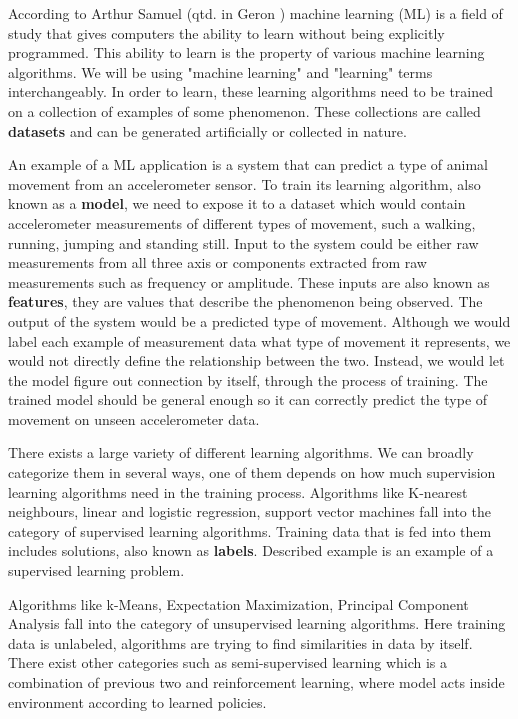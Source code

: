 According to Arthur Samuel (qtd. in Geron \cite{geron}) machine learning (ML) is a field of study that gives computers the ability to learn without being explicitly programmed.
This ability to learn is the property of various machine learning algorithms.
We will be using "machine learning" and "learning" terms interchangeably. 
In order to learn, these learning algorithms need to be trained on a collection of examples of some phenomenon\cite{burkovml}. 
These collections are called \textbf{datasets} and can be generated artificially or collected in nature.

An example of a ML application is a system that can predict a type of animal movement from an accelerometer sensor.
To train its learning algorithm, also known as a \textbf{model}, we need to expose it to a dataset which would contain accelerometer measurements of different types of movement, such a walking, running, jumping and standing still.
Input to the system could be either raw measurements from all three axis or components extracted from raw measurements such as frequency or amplitude. 
These inputs are also known as \textbf{features}, they are values that describe the phenomenon being observed\cite{burkovml}. 
The output of the system would be a predicted type of movement.
Although we would label each example of measurement data what type of movement it represents, we would not directly define the relationship between the two.
Instead, we would let the model figure out connection by itself, through the process of training.
The trained model should be general enough so it can correctly predict the type of movement on unseen accelerometer data.

There exists a large variety of different learning algorithms. 
We can broadly categorize them in several ways, one of them depends on how much supervision learning algorithms need in the training process. 
Algorithms like K-nearest neighbours, linear and logistic regression, support vector machines fall into the category of supervised learning algorithms.
Training data that is fed into them includes solutions, also known as \textbf{labels}\cite{geron}.
Described example is an example of a supervised learning problem.

Algorithms like k-Means, Expectation Maximization, Principal Component Analysis fall into the category of unsupervised learning algorithms.
Here training data is unlabeled, algorithms are trying to find similarities in data by itself\cite{geron}.
There exist other categories such as semi-supervised learning which is a combination of previous two and reinforcement learning, where model acts inside environment according to learned policies\cite{geron}.

